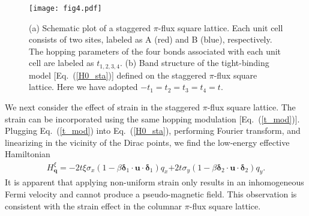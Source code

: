 \documentclass[aps, twocolumn, floatfix, superscriptaddress, prb]{revtex4-1}
\begin{document}
%
\begin{figure}[t]
\centering
\texttt{[image: fig4.pdf]}
\caption{(a) Schematic plot of a staggered $\pi$-flux square lattice. Each unit cell consists of two sites, labeled as A (red) and B (blue), respectively. The hopping parameters of the four bonds associated with each unit cell are labeled as $t_{1,2,3,4}$. (b) Band structure of the tight-binding model [Eq.~(\ref{H0_sta})] defined on the staggered $\pi$-flux square lattice. Here we have adopted $-t_1=t_2=t_3=t_4=t$.
}\label{fig4}
\end{figure}
%


{We next consider the effect of strain in the staggered $\pi$-flux square lattice. The strain can be incorporated using the same hopping modulation  [Eq.~(\ref{t_mod})]. Plugging Eq.~(\ref{t_mod}) into Eq.~(\ref{H0_sta}), performing Fourier transform, and linearizing in the vicinity of the Dirac points, we find the low-energy effective Hamiltonian}
%
\begin{equation}
\begin{split}
{
H_{\bm q}^\xi=-2t\xi\sigma_x(1-\beta\bm{\delta}_1\cdot\bm{u}\cdot\bm{\delta}_1)q_x
}
{
+2t\sigma_y(1-\beta\bm{\delta}_2\cdot\bm{u}\cdot\bm{\delta}_2)q_y.
}
\end{split}
\end{equation}
%
It is apparent that applying non-uniform strain only results in an inhomogeneous Fermi velocity and cannot produce a pseudo-magnetic field. This observation is consistent with the strain effect in the columnar $\pi$-flux square lattice.
\end{document}
